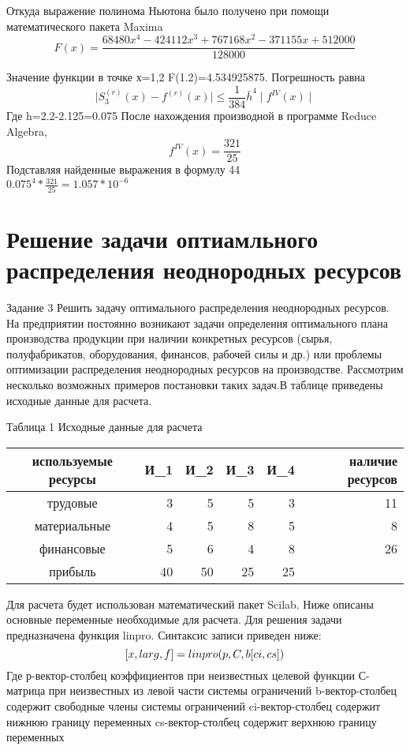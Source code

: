 \documentclass[russian,utf8,nocolumnxxxi,nocolumnxxxii]{eskdtext}
\begin{document}
Откуда выражение полинома Ньютона было получено при помощи математического пакета Maxima  
\begin{equation}
F(x)=\frac{68480 {{x}^{4}}-424112 {{x}^{3}}+767168 {{x}^{2}}-371155 x+512000}{128000}
\end{equation}

Значение функции в точке х=1,2 F(1.2)=4.534925875.
Погрешность равна
\begin{equation}
\mid S^{(r)}_3(x) - f^{(r)}(x) \mid \leqslant \frac{1}{384} \bar{h}^4 \mid f^{IV}(x)\mid
\end{equation} 
Где h=2.2-2.125=0.075
После нахождения производной в программе Reduce Algebra,
\begin{equation}
f^{IV}(x)=\frac{321}{25}
\end{equation} 
Подставляя найденные выражения в формулу 44\\

$0.075^4 * \frac{321}{25}=1.057*10^{-6} $

\newpage

\section{Решение задачи оптиамльного распределения неоднородных ресурсов}
Задание 3
Решить задачу оптимального распределения неоднородных ресурсов. На предприятии постоянно возникают задачи определения
оптимального плана производства продукции при наличии конкретных ресурсов (сырья, полуфабрикатов, оборудования, финансов, рабочей силы и др.) или проблемы оптимизации распределения неоднородных ресурсов на производстве. Рассмотрим несколько возможных примеров постановки таких задач.В таблице приведены исходные данные для расчета.

Таблица 1 Исходные данные для расчета

\begin{tabular}{|c|r|r|r|r|r|}
\hline
используемые ресурсы & И_1 & И_2 & И_3 & И_4 & наличие ресурсов \\
\hline
трудовые & 3 & 5 & 5 & 3 & 11 \\
\hline
материальные & 4 & 5 & 8 & 5 & 8 \\
\hline
финансовые & 5 & 6 & 4 & 8 & 26 \\
\hline
прибыль & 40 & 50 & 25 & 25 &  \\
\hline
\end{tabular}

Для расчета будет использован математический пакет Scilab. Ниже описаны основные переменные необходимые для расчета.
Для решения задачи предназначена функция linpro. Синтаксис записи приведен ниже:
\begin{equation}
$$[x,larg,f]=linpro(p,C,b[ci,cs])$$
\end{equation}
Где р-вектор-столбец коэффициентов при неизвестных целевой функции
С-матрица при неизвестных из левой части системы ограничений
b-вектор-столбец содержит свободные члены системы ограничений
ci-вектор-столбец содержит нижнюю границу переменных
cs-вектор-столбец содержит верхнюю границу переменных
\end{document}
